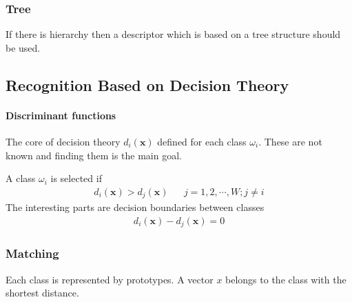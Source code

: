 \subsubsection{Tree}
If there is hierarchy then a descriptor which is based on a tree structure
should be used.


\subsection{Recognition Based on Decision Theory}
\paragraph{Discriminant functions}
The core of decision theory $d_i(\mathbf{x})$ defined for each class $\omega_i$.
These are not known and finding them is the main goal.

A class $\omega_i$ is selected if
\begin{align*}
d_i(\mathbf{x}) > d_j(\mathbf{x}) && j=1,2, \cdots, W; j \neq i
\end{align*}
The interesting parts are decision boundaries between classes
\begin{align*}
	d_i(\mathbf{x}) - d_j(\mathbf{x}) = 0
\end{align*}

\subsubsection{Matching}
Each class is represented by prototypes.
A vector $x$ belongs to the class with the shortest distance.
